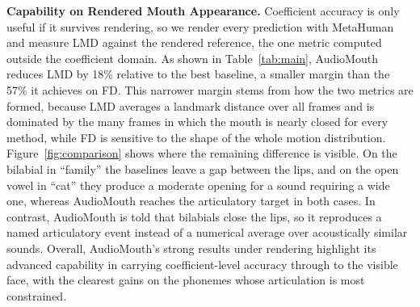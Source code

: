 \noindent\textbf{Capability on Rendered Mouth Appearance.}\quad
Coefficient accuracy is only useful if it survives rendering, so we render every prediction with MetaHuman and measure LMD against the rendered reference, the one metric computed outside the coefficient domain. As shown in Table~\ref{tab:main}, AudioMouth reduces LMD by 18\% relative to the best baseline, a smaller margin than the 57\% it achieves on FD. This narrower margin stems from how the two metrics are formed, because LMD averages a landmark distance over all frames and is dominated by the many frames in which the mouth is nearly closed for every method, while FD is sensitive to the shape of the whole motion distribution. Figure~\ref{fig:comparison} shows where the remaining difference is visible. On the bilabial in ``family'' the baselines leave a gap between the lips, and on the open vowel in ``cat'' they produce a moderate opening for a sound requiring a wide one, whereas AudioMouth reaches the articulatory target in both cases. In contrast, AudioMouth is told that bilabials close the lips, so it reproduces a named articulatory event instead of a numerical average over acoustically similar sounds. Overall, AudioMouth's strong results under rendering highlight its advanced capability in carrying coefficient-level accuracy through to the visible face, with the clearest gains on the phonemes whose articulation is most constrained.
